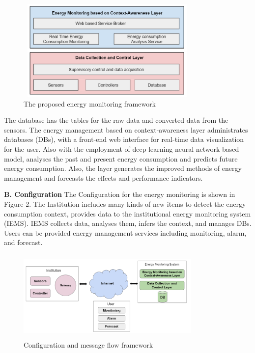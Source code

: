 \documentclass[journal]{IEEEtran}
\begin{document}
\begin{figure}[H]%
\begin {center}
\includegraphics[width=9cm,height=5cm]{images/ieee fig1.png}
\caption{The proposed energy monitoring framework}
\end {center}
\end{figure}
The database has the tables for the raw data and converted data from the sensors. The energy management based on context-awareness layer administrates databases (DBs), with a front-end web interface for real-time data visualization for the user. Also with the employment of deep learning neural network-based model, analyses the past and present energy consumption and predicts future energy consumption. Also, the layer generates the
improved methods of energy management and forecasts the effects and performance indicators.
\newline

\textbf{B. Configuration}
\newline
The Configuration for the energy monitoring is shown in Figure 2. The Institution includes many kinds of new items to detect the energy consumption context, provides data to the institutional energy monitoring system (IEMS). IEMS collects data, analyses them, infers the context, and manages DBs. Users can be provided energy management services including monitoring, alarm, and forecast.

 \begin{figure}[H]%
\begin {center}
\includegraphics[width=9cm,height=4.5cm]{images/iee fig2.png}
\caption{Configuration and message flow framework}
\end {center}
\end{figure}
\end{document}
